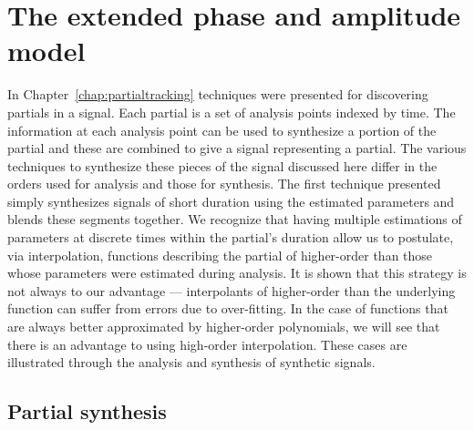 \chapter{The extended phase and amplitude model\label{chap:exphsmodel}}

In Chapter~\ref{chap:partialtracking} techniques were presented for discovering
partials in a signal. Each partial is a set of analysis points indexed by time.
The information at each analysis point can be used to synthesize a portion of
the partial and these are combined to give a signal representing a partial.
The various techniques to synthesize these pieces of the signal discussed here
differ in the orders used for analysis and those for synthesis. The first
technique presented simply synthesizes signals of short duration using the
estimated parameters and blends these segments together. We recognize that
having multiple estimations of parameters at discrete times within the partial's
duration allow us to postulate, via interpolation, functions describing the
partial of higher-order than those whose parameters were estimated during
analysis. It is shown that this strategy is not always to our advantage ---
interpolants of higher-order than the underlying function can suffer from errors
due to over-fitting. In the case of functions that are always better
approximated by higher-order polynomials, we will see that there is an advantage
to using high-order interpolation. These cases are illustrated through the
analysis and synthesis of synthetic signals.

\section{Partial synthesis \label{sec:partialsynthesis}}

